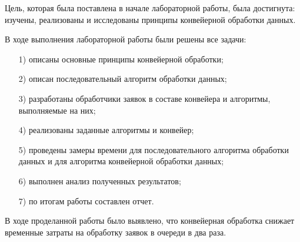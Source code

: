 
Цель, которая была поставлена в начале лабораторной работы, была достигнута: изучены, реализованы и исследованы принципы конвейерной обработки данных.

В ходе выполнения лабораторной работы были решены все задачи:
\begin{enumerate}[itemindent=1.25em]
	\item[1)] описаны основные принципы конвейерной обработки;
\item[2)] описан последовательный алгоритм обработки данных;
\item[3)]
разработаны обработчики заявок в составе конвейера и алгоритмы, выполняемые на них;
\item[4)] реализованы заданные алгоритмы и конвейер;
\item[5)] проведены замеры времени для последовательного алгоритма обработки данных и для алгоритма конвейерной обработки данных;%
\item[6)] выполнен анализ полученных результатов;
\item[7)] по итогам работы составлен отчет.
\end{enumerate}


В ходе проделанной работы было выявлено, что конвейерная обработка снижает временные затраты на обработку заявок в очереди в два раза.